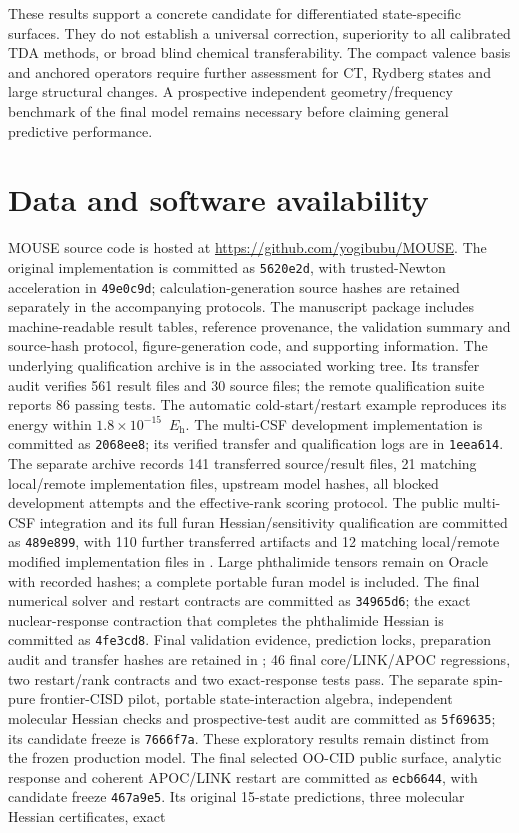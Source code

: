 \documentclass[11pt,a4paper]{article}
\newcommand{\Eh}{\ensuremath{E_{\mathrm h}}}
\begin{document}
These results support a concrete candidate for differentiated state-specific
surfaces. They do not establish a universal correction, superiority to all
calibrated TDA methods, or broad blind chemical transferability. The compact
valence basis and anchored operators require further assessment for CT,
Rydberg states and large structural changes. A prospective independent
geometry/frequency benchmark of the final model remains necessary before
claiming general predictive performance.

\section*{Data and software availability}
MOUSE source code is hosted at \url{https://github.com/yogibubu/MOUSE}. The original implementation is committed as \texttt{5620e2d}, with trusted-Newton acceleration in \texttt{49e0c9d}; calculation-generation source hashes are retained separately in the accompanying protocols. The manuscript package includes machine-readable result tables, reference provenance, the validation summary and source-hash protocol, figure-generation code, and supporting information. The underlying qualification archive is  in the associated working tree. Its transfer audit verifies 561 result files and 30 source files; the remote qualification suite reports 86 passing tests. The automatic cold-start/restart example reproduces its energy within $1.8\times10^{-15}$~\Eh. The multi-CSF development implementation is committed as \texttt{2068ee8}; its verified transfer and qualification logs are in \texttt{1eea614}. The separate  archive records 141 transferred source/result files, 21 matching local/remote implementation files, upstream model hashes, all blocked development attempts and the effective-rank scoring protocol. The public multi-CSF integration and its full furan Hessian/sensitivity qualification are committed as \texttt{489e899}, with 110 further transferred artifacts and 12 matching local/remote modified implementation files in . Large phthalimide tensors remain on Oracle with recorded hashes; a complete portable furan model is included. The final numerical solver and restart contracts are committed as \texttt{34965d6}; the exact nuclear-response contraction that completes the phthalimide Hessian is committed as \texttt{4fe3cd8}. Final validation evidence, prediction locks, preparation audit and transfer hashes are retained in ; 46 final core/LINK/APOC regressions, two restart/rank contracts and two exact-response tests pass. The separate spin-pure frontier-CISD pilot, portable state-interaction algebra, independent molecular Hessian checks and prospective-test audit are committed as \texttt{5f69635}; its candidate freeze is \texttt{7666f7a}. These exploratory results remain distinct from the frozen production model. The final selected OO-CID public surface, analytic response and coherent APOC/LINK restart are committed as \texttt{ecb6644}, with candidate freeze \texttt{467a9e5}. Its original 15-state predictions, three molecular Hessian certificates, exact 
\end{document}

